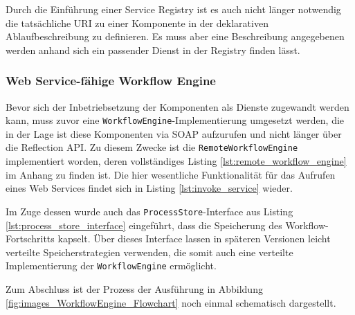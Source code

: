   

  Durch die Einführung einer Service Registry ist es auch nicht länger notwendig die tatsäch\-liche URI zu einer Komponente in der deklarativen Ablaufbeschreibung zu definieren. Es muss aber eine Beschreibung angegebenen werden anhand sich ein passender Dienst in der Registry finden lässt.
  

\subsubsection{Web Service-fähige Workflow Engine} %
\label{ssub:web_service_faehige_workflow_engine}

  Bevor sich der Inbetriebsetzung der Komponenten als Dienste zugewandt werden kann, muss zuvor eine \verb!WorkflowEngine!-Implementierung umgesetzt werden, die in der Lage ist diese Komponenten via SOAP aufzurufen und nicht länger über die Reflection API. Zu diesem Zwecke ist die \verb!RemoteWorkflowEngine! implementiert worden, deren vollständiges Listing \ref{lst:remote_workflow_engine} im Anhang zu finden ist. Die hier wesentliche Funktionalität für das Aufrufen eines Web Services findet sich in Listing \ref{lst:invoke_service} wieder.
  
  
  
  Im Zuge dessen wurde auch das \verb!ProcessStore!-Interface aus Listing \ref{lst:process_store_interface} eingeführt, dass die Speicherung des Workflow-Fortschritts kapselt. Über dieses Interface lassen in späteren Versionen leicht verteilte Speicherstrategien verwenden, die somit auch eine verteilte Implementierung der \verb!WorkflowEngine! ermöglicht.
  
  
  
  Zum Abschluss ist der Prozess der Ausführung in Abbildung \ref{fig:images_WorkflowEngine_Flowchart} noch einmal schematisch dargestellt.
  
